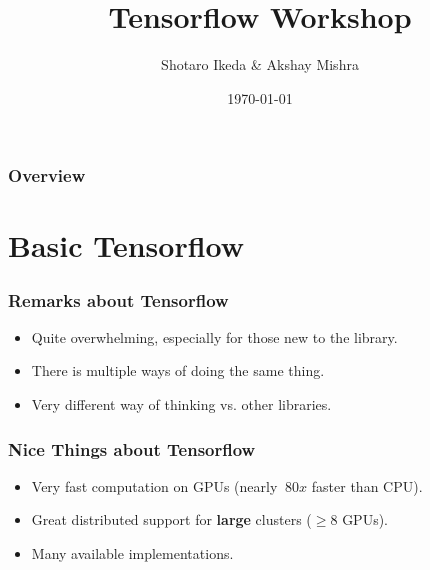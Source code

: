 \documentclass{beamer}
\title[Tensorflow Workshop]{Tensorflow Workshop} %
\author{Shotaro Ikeda \& Akshay Mishra} %
\institute[SIGAI] %
{
  \textit{http://sigai.ml} %
}
\date{\today} %
\begin{document}
\begin{frame}
  \titlepage %
\end{frame}

\begin{frame}
  \frametitle{Overview} %
  \tableofcontents %
\end{frame}


\section{Basic Tensorflow}

\begin{frame}
  \frametitle{Remarks about Tensorflow}
  \begin{itemize}
  \item Quite overwhelming, especially for those new to the library.
  \item There is multiple ways of doing the same thing.
  \item Very different way of thinking vs. other libraries.
  \end{itemize}
\end{frame}

\begin{frame}
  \frametitle{Nice Things about Tensorflow}
  \begin{itemize}
  \item Very fast computation on GPUs (nearly $~80x$ faster than CPU).
  \item Great distributed support for \textbf{large} clusters ($\geq 8$ GPUs).
  \item Many available implementations.
  \end{itemize}
\end{frame}
\end{document}
